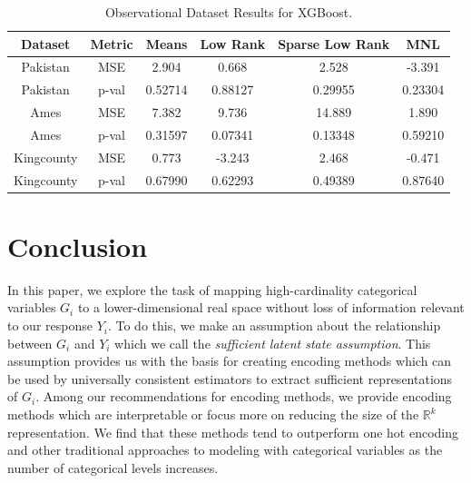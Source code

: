 \documentclass{article}
\theoremstyle{plain}
\theoremstyle{definition}
\theoremstyle{remark}
\begin{document}




\begin{table}[H]
	\centering
	\begin{tabular}{|c|c|c|c|c|c|}
		\hline
		Dataset& Metric & Means & Low Rank & Sparse Low Rank & MNL  \\
		\hline
		Pakistan & MSE & 2.904 &0.668 & 2.528&-3.391\\
		Pakistan & p-val&0.52714  &0.88127 &0.29955 &0.23304 \\
		\hline
		Ames & MSE & 7.382 & 9.736& 14.889& 1.890\\
		Ames & p-val& 0.31597&0.07341 & 0.13348& 0.59210\\
		\hline
		Kingcounty & MSE & 0.773& -3.243&2.468 & -0.471\\
		Kingcounty & p-val&0.67990&0.62293&0.49389& 0.87640\\
		\hline
	\end{tabular}
	\caption{Observational Dataset Results for XGBoost.}
	\label{tab:observational_xgb}
\end{table}



\section{Conclusion}

In this paper, we explore the task of mapping high-cardinality categorical variables $G_i$ to a lower-dimensional real space without loss of information relevant to our response $Y_i$. To do this, we make an assumption about the relationship between $G_i$ and $Y_i$ which we call the \textit{sufficient latent state assumption}. This assumption provides us with the basis for creating encoding methods which can be used by universally consistent estimators to extract sufficient representations of $G_i$. Among our recommendations for encoding methods, we provide encoding methods which are interpretable or focus more on reducing the size of the  $\mathbb{R}^k$ representation. We find that these methods tend to outperform one hot encoding and other traditional approaches to modeling with categorical variables as the number of categorical levels increases.
\end{document}
